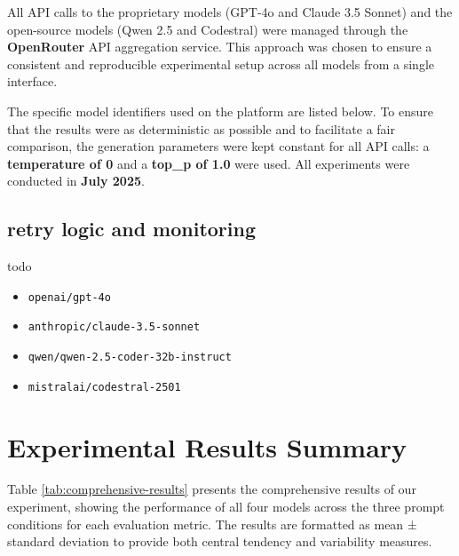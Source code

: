 All API calls to the proprietary models (GPT-4o and Claude 3.5 Sonnet) and the open-source models (Qwen 2.5 and Codestral) were managed through the \textbf{OpenRouter} API aggregation service. This approach was chosen to ensure a consistent and reproducible experimental setup across all models from a single interface.

The specific model identifiers used on the platform are listed below. To ensure that the results were as deterministic as possible and to facilitate a fair comparison, the generation parameters were kept constant for all API calls: a \textbf{temperature of 0} and a \textbf{top\_p of 1.0} were used. All experiments were conducted in \textbf{July 2025}.
\subsection{retry logic and monitoring}

todo
\begin{itemize}
    \item \texttt{openai/gpt-4o}
    \item \texttt{anthropic/claude-3.5-sonnet}
    \item \texttt{qwen/qwen-2.5-coder-32b-instruct} 
    \item \texttt{mistralai/codestral-2501}
\end{itemize}

\section{Experimental Results Summary}
Table \ref{tab:comprehensive-results} presents the comprehensive results of our experiment, showing the performance of all four models across the three prompt conditions for each evaluation metric. The results are formatted as mean ± standard deviation to provide both central tendency and variability measures.

